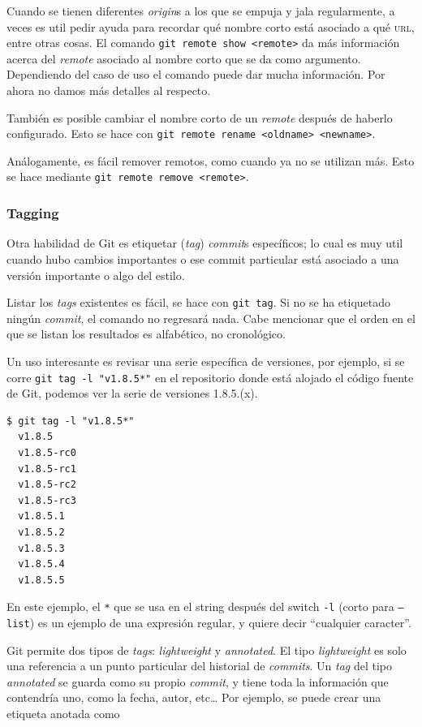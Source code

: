 \documentclass[spanish, 12pt, a4paper]{article}
\begin{document}
Cuando se tienen diferentes \emph{origin}s a los que se empuja y jala
regularmente, a veces es util pedir ayuda para recordar qué nombre corto
está asociado a qué \textsc{url}, entre otras cosas. El comando
\passthrough{\lstinline!git remote show <remote>!} da más información
acerca del \emph{remote} asociado al nombre corto que se da como
argumento. Dependiendo del caso de uso el comando puede dar mucha
información. Por ahora no damos más detalles al respecto.

También es posible cambiar el nombre corto de un \emph{remote} después
de haberlo configurado. Esto se hace con
\passthrough{\lstinline!git remote rename <oldname> <newname>!}.

Análogamente, es fácil remover remotos, como cuando ya no se utilizan
más. Esto se hace mediante
\passthrough{\lstinline!git remote remove <remote>!}.

\subsubsection{Tagging}

Otra habilidad de Git es etiquetar (\emph{tag}) \emph{commit}s
específicos; lo cual es muy util cuando hubo cambios importantes o ese
commit particular está asociado a una versión importante o algo del
estilo.

Listar los \emph{tags} existentes es fácil, se hace con
\passthrough{\lstinline!git tag!}. Si no se ha etiquetado ningún
\emph{commit}, el comando no regresará nada. Cabe mencionar que el orden
en el que se listan los resultados es alfabético, no cronológico.

Un uso interesante es revisar una serie específica de versiones, por
ejemplo, si se corre \passthrough{\lstinline!git tag -l "v1.8.5*"!} en
el repositorio donde está alojado el código fuente de Git, podemos ver
la serie de versiones 1.8.5.(x).

\begin{lstlisting}
$ git tag -l "v1.8.5*"
  v1.8.5
  v1.8.5-rc0
  v1.8.5-rc1
  v1.8.5-rc2
  v1.8.5-rc3
  v1.8.5.1
  v1.8.5.2
  v1.8.5.3
  v1.8.5.4
  v1.8.5.5
\end{lstlisting}

En este ejemplo, el \passthrough{\lstinline!*!} que se usa en el string
después del switch \passthrough{\lstinline!-l!} (corto para
\passthrough{\lstinline!–list!}) es un ejemplo de una expresión regular,
y quiere decir ``cualquier caracter''.

Git permite dos tipos de \emph{tags}: \emph{lightweight} y
\emph{annotated}. El tipo \emph{lightweight} es solo una referencia a un
punto particular del historial de \emph{commits}. Un \emph{tag} del tipo
\emph{annotated} se guarda como su propio \emph{commit}, y tiene toda la
información que contendría uno, como la fecha, autor, etc\ldots{} Por
ejemplo, se puede crear una etiqueta anotada como
\end{document}
